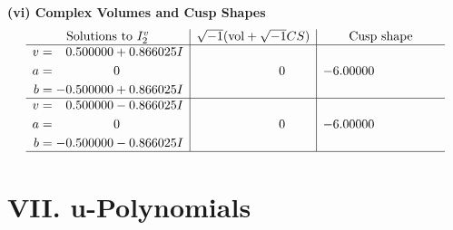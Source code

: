 \documentclass[1p]{elsarticle_modified}
\theoremstyle{definition}
\newcommand{\I}{\sqrt{-1}}
\begin{document}
\newpage\flushleft \textbf{(vi) Complex Volumes and Cusp Shapes}
$$\begin{array}{c|c|c}  
\text{Solutions to }I^v_{2}& \I (\text{vol} + \sqrt{-1}CS) & \text{Cusp shape}\\
 \hline 
\begin{aligned}
v &= \phantom{-}0.500000 + 0.866025 I \\
a &= \phantom{-0.000000 } 0 \\
b &= -0.500000 + 0.866025 I\end{aligned}
 & \phantom{-0.000000 } 0 & -6.00000\phantom{ +0.000000I} \\ \hline\begin{aligned}
v &= \phantom{-}0.500000 - 0.866025 I \\
a &= \phantom{-0.000000 } 0 \\
b &= -0.500000 - 0.866025 I\end{aligned}
 & \phantom{-0.000000 } 0 & -6.00000\phantom{ +0.000000I}\\
 \hline 
 \end{array}$$\newpage
\newpage\renewcommand{\arraystretch}{1}
\centering \section*{ VII. u-Polynomials}
\end{document}
